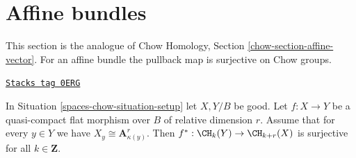 \section{Affine bundles}
\label{spaces-chow-section-affine-vector}
This section is the analogue of
Chow Homology, Section \ref{chow-section-affine-vector}.
For an affine bundle the pullback map is surjective on Chow groups.

\begin{lemma}
\label{spaces-chow-lemma-pullback-affine-fibres-surjective}
\href{https://stacks.math.columbia.edu/tag/0ERG}{\texttt{Stacks tag 0ERG}}

In Situation \ref{spaces-chow-situation-setup} let $X, Y/B$ be good.
Let $f : X \to Y$ be a quasi-compact flat morphism over $B$
of relative dimension $r$. Assume that for every $y \in Y$ we have
$X_y \cong \mathbf{A}^r_{\kappa(y)}$.
Then $f^* : \CH_k(Y) \to \CH_{k + r}(X)$ is surjective for all
$k \in \mathbf{Z}$.
\end{lemma}

